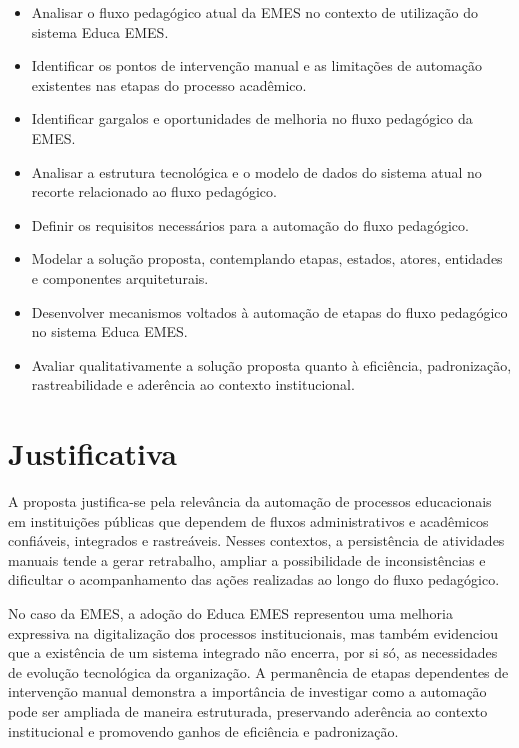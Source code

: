 \begin{itemize}
\item Analisar o fluxo pedagógico atual da EMES no contexto de utilização do
sistema Educa EMES.

\item Identificar os pontos de intervenção manual e as limitações de automação
existentes nas etapas do processo acadêmico.

\item Identificar gargalos e oportunidades de melhoria no fluxo pedagógico da
EMES.

\item Analisar a estrutura tecnológica e o modelo de dados do sistema atual no
recorte relacionado ao fluxo pedagógico.

\item Definir os requisitos necessários para a automação do fluxo pedagógico.


\item Modelar a solução proposta, contemplando etapas, estados, atores,
entidades e componentes arquiteturais.

\item Desenvolver mecanismos voltados à automação de etapas do fluxo pedagógico
no sistema Educa EMES.

\item Avaliar qualitativamente a solução proposta quanto à eficiência,
padronização, rastreabilidade e aderência ao contexto institucional.

\end{itemize}

\section{Justificativa}
\label{sec:intro:jus}

A proposta justifica-se pela relevância da automação de processos
educacionais em instituições públicas que dependem de fluxos administrativos e
acadêmicos confiáveis, integrados e rastreáveis. Nesses contextos, a
persistência de atividades manuais tende a gerar retrabalho, ampliar a
possibilidade de inconsistências e dificultar o acompanhamento das
ações realizadas ao longo do fluxo pedagógico.

No caso da EMES, a adoção do Educa EMES representou uma melhoria expressiva na
digitalização dos processos institucionais, mas também evidenciou que a
existência de um sistema integrado não encerra, por si só, as necessidades de
evolução tecnológica da organização. A permanência de etapas dependentes de
intervenção manual demonstra a importância de investigar como a automação pode
ser ampliada de maneira estruturada, preservando aderência ao contexto
institucional e promovendo ganhos de eficiência e padronização.

